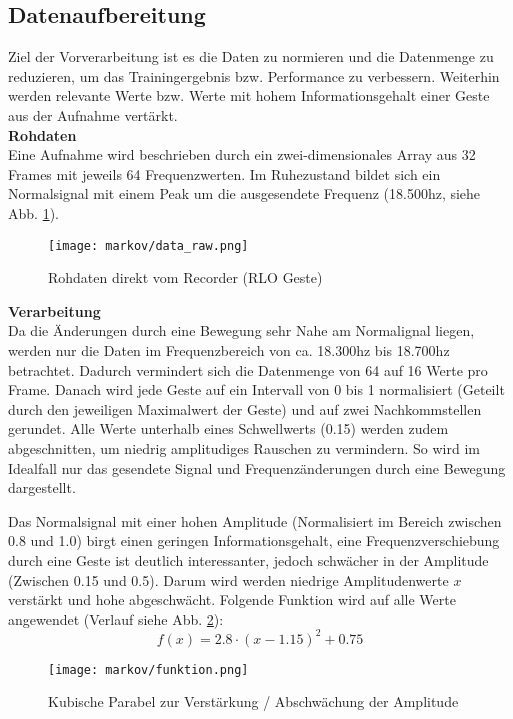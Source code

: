 \subsection{Datenaufbereitung} \label{sec:preproc}
Ziel der Vorverarbeitung ist es die Daten zu normieren und die Datenmenge zu reduzieren, um das Trainingergebnis bzw. Performance zu verbessern.
Weiterhin werden relevante Werte bzw. Werte mit hohem Informationsgehalt einer Geste aus der Aufnahme vertärkt. \\


\textbf{Rohdaten} \\
Eine Aufnahme wird beschrieben durch ein zwei-dimensionales Array aus 32 Frames mit jeweils 64 Frequenzwerten.
Im Ruhezustand bildet sich ein Normalsignal mit einem Peak um die ausgesendete Frequenz (18.500hz, siehe Abb. \ref{fig:data_raw}).

\begin{figure}[htbp] \centering
    \texttt{[image: markov/data\_raw.png]}
    \caption{Rohdaten direkt vom Recorder (\acl{RLO} Geste)}
    \label{fig:data_raw}
\end{figure}

\textbf{Verarbeitung}\\
Da die Änderungen durch eine Bewegung sehr Nahe am Normalignal liegen, werden nur die Daten im 
Frequenzbereich von ca. 18.300hz bis 18.700hz betrachtet. Dadurch vermindert sich die Datenmenge von 64 auf 16 Werte pro Frame. 
Danach wird jede Geste auf ein Intervall von 0 bis 1 normalisiert (Geteilt durch den jeweiligen Maximalwert der Geste) und 
auf zwei Nachkommstellen gerundet. 
Alle Werte unterhalb eines Schwellwerts (0.15) werden zudem abgeschnitten, um niedrig amplitudiges Rauschen zu vermindern. 
So wird im Idealfall nur das gesendete Signal und Frequenzänderungen durch eine Bewegung dargestellt.

Das Normalsignal mit einer hohen Amplitude (Normalisiert im Bereich zwischen 0.8 und 1.0) birgt einen geringen Informationsgehalt, 
eine Frequenzverschiebung durch eine Geste ist deutlich interessanter, jedoch schwächer in der Amplitude (Zwischen 0.15 und 0.5).
Darum wird werden niedrige Amplitudenwerte \( x \) verstärkt und hohe abgeschwächt. 
Folgende Funktion wird auf alle Werte angewendet  (Verlauf siehe Abb. \ref{fig:funktion}): \\
\[ f(x) = 2.8 \cdot ( x - 1.15 )^2 + 0.75 \]
\begin{figure}[htbp] \centering
    \texttt{[image: markov/funktion.png]}
    \caption{Kubische Parabel zur Verstärkung / Abschwächung der Amplitude}
    \label{fig:funktion}
\end{figure}

